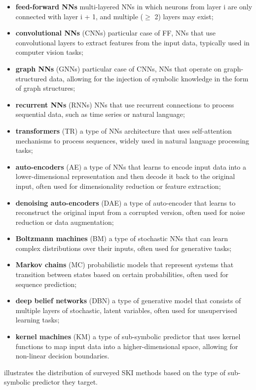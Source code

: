 \begin{itemize}
    \item \textbf{feed-forward NNs} multi-layered \glspl{NN} in which neurons from layer i are only connected with layer i + 1, and multiple ($\ge$ 2) layers may exist;
    \item \textbf{convolutional NNs} (CNNs) particular case of FF, \glspl{NN} that use convolutional layers to extract features from the input data, typically used in computer vision tasks;
    \item \textbf{graph NNs} (GNNs) particular case of \glspl{CNN}, \glspl{NN} that operate on graph-structured data, allowing for the injection of symbolic knowledge in the form of graph structures;
    \item \textbf{recurrent NNs} (RNNs) \glspl{NN} that use recurrent connections to process sequential data, such as time series or natural language;
    \item \textbf{transformers} (TR) a type of \glspl{NN} architecture that uses self-attention mechanisms to process sequences, widely used in natural language processing tasks;
    \item \textbf{auto-encoders} (AE) a type of \glspl{NN} that learns to encode input data into a lower-dimensional representation and then decode it back to the original input, often used for dimensionality reduction or feature extraction;
    \item \textbf{denoising auto-encoders} (DAE) a type of auto-encoder that learns to reconstruct the original input from a corrupted version, often used for noise reduction or data augmentation;
    \item \textbf{Boltzmann machines} (BM) a type of stochastic \glspl{NN} that can learn complex distributions over their inputs, often used for generative tasks;
    \item \textbf{Markov chains} (MC) probabilistic models that represent systems that transition between states based on certain probabilities, often used for sequence prediction;
    \item \textbf{deep belief networks} (DBN) a type of generative model that consists of multiple layers of stochastic, latent variables, often used for unsupervised learning tasks;
    \item \textbf{kernel machines} (KM) a type of sub-symbolic predictor that uses kernel functions to map input data into a higher-dimensional space, allowing for non-linear decision boundaries.
\end{itemize}
%
 illustrates the distribution of surveyed \gls{SKI} methods based on the type of sub-symbolic predictor they target.

